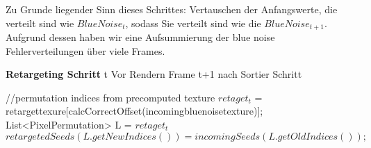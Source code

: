 \cite{hal02158423}

Zu Grunde liegender Sinn dieses Schrittes: Vertauschen der Anfangswerte, die 
verteilt sind wie $BlueNoise_{t}$, sodass Sie verteilt sind wie die 
$BlueNoise_{t+1}$. Aufgrund dessen haben wir eine Aufsummierung der
blue noise Fehlerverteilungen über viele Frames.

\begin{algorithm}[H]
    \caption{\textbf{Retargeting Schritt} t Vor Rendern Frame t+1 nach Sortier Schritt}
    \begin{algorithmic}[1]
        \State //permutation indices from precomputed texture
        \State $retaget_{t}$ = retargettexure[calcCorrectOffset(incomingbluenoisetexture)];
        \State List<PixelPermutation> L = $retaget_{t}$
        \State $retargetedSeeds(L.getNewIndices()) = incomingSeeds(L.getOldIndices());$
        \EndFor
    \end{algorithmic}
    \label{alg:retargeting}
\end{algorithm}
